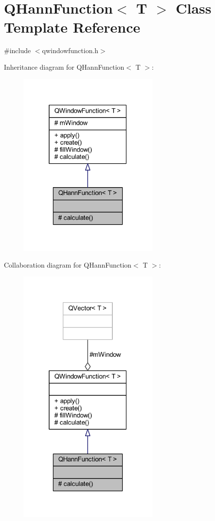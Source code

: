 \hypertarget{a00057}{\section{Q\+Hann\+Function$<$ T $>$ Class Template Reference}
\label{a00057}
}


{\ttfamily \#include $<$qwindowfunction.\+h$>$}



Inheritance diagram for Q\+Hann\+Function$<$ T $>$\+:
\nopagebreak
\begin{figure}[H]
\begin{center}
\leavevmode
\includegraphics[width=199pt]{dc/d20/a00534}
\end{center}
\end{figure}


Collaboration diagram for Q\+Hann\+Function$<$ T $>$\+:
\nopagebreak
\begin{figure}[H]
\begin{center}
\leavevmode
\includegraphics[width=199pt]{d7/d84/a00535}
\end{center}
\end{figure}
